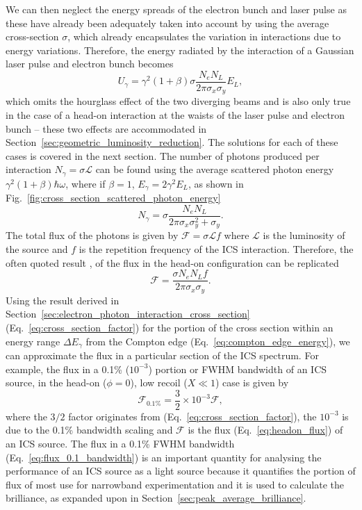 \documentclass[../main.tex]{subfiles}
\begin{document}
We can then neglect the energy spreads of the electron bunch and laser pulse as these have already been adequately taken into account by using the average cross-section $\sigma$, which already encapsulates the variation in interactions due to energy variations. Therefore, the energy radiated by the interaction of a Gaussian laser pulse and electron bunch becomes  
\begin{equation}
U_{\gamma} = \gamma^{2}\left(1+\beta\right)\sigma\frac{N_{e}N_{L}}{2\pi\sigma_{x}\sigma_{y}}E_{L},
\label{eq:total_interaction_energy_simplified}
\end{equation}
which omits the hourglass effect of the two diverging beams and is also only true in the case of a head-on interaction at the waists of the laser pulse and electron bunch -- these two effects are accommodated in Section~\ref{sec:geometric_luminosity_reduction}. The solutions for each of these cases is covered in the next section. The number of photons produced per interaction $N_{\gamma}=\sigma\mathcal{L}$ can be found using the average scattered photon energy $\gamma^{2}\left(1+\beta\right)\hbar\omega$, where if $\beta=1$, $E_{\gamma} = 2\gamma^{2}E_{L}$, as shown in Fig.~\ref{fig:cross_section_scattered_photon_energy} 
\begin{equation}
N_{\gamma} = \sigma\frac{N_{e}N_{L}}{2\pi\sigma_{x}\sigma_{y}^{2}+\sigma_{y}}.
\label{eq:no_photon_headon}
\end{equation}
The total flux of the photons is given by $\mathcal{F} = \sigma\mathcal{L}f$ where $\mathcal{L}$ is the luminosity of the source and $f$ is the repetition frequency of the ICS interaction. Therefore, the often quoted result \cite{krafft2010compton,curatolo2017analytical}, of the flux in the head-on configuration can  be replicated
\begin{equation}
\mathcal{F} = \frac{\sigma N_{e}N_{L}f}{2\pi\sigma_{x}\sigma_{y}}.
\label{eq:headon_flux}
\end{equation}
Using the result derived in Section~\ref{sec:electron_photon_interaction_cross_section} (Eq.~\ref{eq:cross_section_factor}) for the portion of the cross section within an energy range $\Delta E_{\gamma}$ from the Compton edge (Eq.~\ref{eq:compton_edge_energy}), we can approximate the flux in a particular section of the ICS spectrum. For example, the flux in a 0.1\% ($10^{-3}$) portion or FWHM bandwidth of an ICS source, in the head-on ($\phi=0$), low recoil ($X \ll 1$) case is given by
\begin{equation}
\mathcal{F}_{0.1\%} = \frac{3}{2}\times 10^{-3} \mathcal{F},
\label{eq:flux_0.1_bandwidth}    
\end{equation}
where the $3/2$ factor originates from (Eq.~\ref{eq:cross_section_factor}), the $10^{-3}$ is due to the 0.1\% bandwidth scaling and $\mathcal{F}$ is the flux (Eq.~\ref{eq:headon_flux}) of an ICS source. The flux in a 0.1\% FWHM bandwidth (Eq.~\ref{eq:flux_0.1_bandwidth}) is an important quantity for analysing the performance of an ICS source as a light source because it quantifies the portion of flux of most use for narrowband experimentation and it is used to calculate the brilliance, as expanded upon in Section~\ref{sec:peak_average_brilliance}. 
\end{document}
